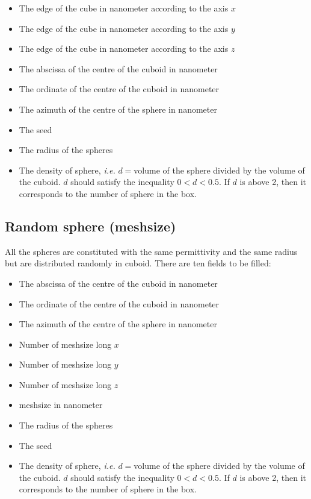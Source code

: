 \begin{itemize}
\item The edge of the cube in nanometer according to the axis $x$
\item The edge of the cube in nanometer according to the axis $y$
\item The edge of the cube in nanometer according to the axis $z$
\item The abscissa of the centre of the cuboid in nanometer
\item The ordinate of the centre of the cuboid in nanometer
\item The azimuth of the centre of the sphere in nanometer
\item The seed
\item The radius of the spheres
\item The density of sphere, {\it i.e.}  $d=$volume of the sphere
  divided by the volume of the cuboid. $d$ should satisfy the inequality
  $0<d<0.5$. If $d$ is above 2, then it corresponds to the number of
  sphere in the box.
\end{itemize}

\subsection{Random sphere (meshsize)}

All the spheres are constituted with the same permittivity and the
same radius but are distributed randomly in cuboid. There are ten
fields to be filled:

\begin{itemize}
\item The abscissa of the centre of the cuboid in nanometer
\item The ordinate of the centre of the cuboid in nanometer
\item The azimuth of the centre of the sphere in nanometer
\item Number of meshsize long $x$
\item Number of meshsize long $y$
\item Number of meshsize long $z$
\item meshsize in nanometer
\item The radius of the spheres
\item The seed
\item The density of sphere, {\it i.e.}  $d=$volume of the sphere
  divided by the volume of the cuboid. $d$ should satisfy the inequality
  $0<d<0.5$. If $d$ is above 2, then it corresponds to the number of
  sphere in the box.
\end{itemize}

